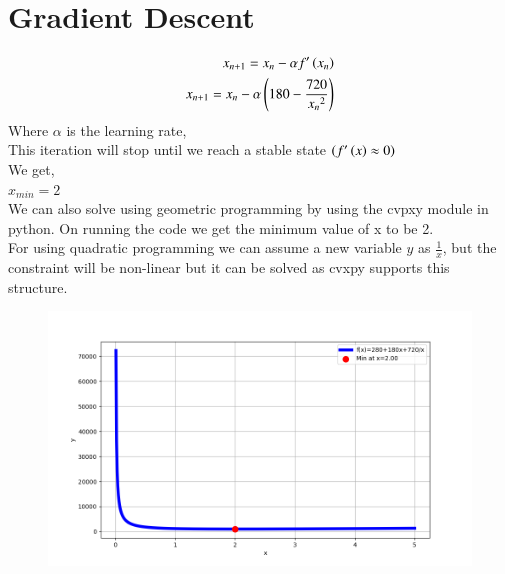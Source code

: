 \documentclass[journal,12pt,onecolumn]{IEEEtran}
\theoremstyle{remark}
\begin{document}
\section{Gradient Descent}
\begin{align}
    x_{n+1}=x_n-\alpha f^{\prime}\left(x_n\right)\\
     x_{n+1}=x_n-\alpha \left(180-\frac{720}{{x_n}^2}\right)
\end{align}
Where $\alpha$ is the learning rate,\\
This iteration will stop until we reach a stable state $\left(f^{\prime}\left(x\right) \approx0\right)$\\
We get,\\
$x_{min}=2$\\
We can also solve using geometric programming by using the cvpxy module in python. On running the code we get the minimum value of x to be 2.\\
For using quadratic programming we can assume a new variable $y$ as $\frac{1}{x}$, but the constraint will be non-linear but it can be solved as cvxpy supports this structure.
\begin{figure}[h]
\centering
\includegraphics[width=\columnwidth]{figs/Q4.png}
\end{figure}
\end{document}

